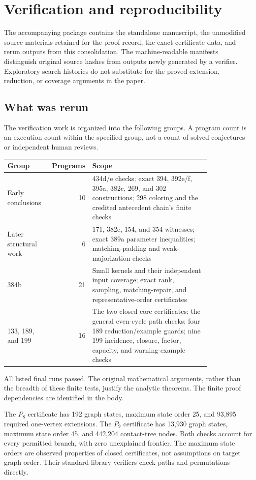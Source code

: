 \documentclass[11pt,a4paper]{article}
\theoremstyle{definition}\newtheorem{definition}[theorem]{Definition}
\theoremstyle{remark}\newtheorem{remark}[theorem]{Remark}
\begin{document}
\section{Verification and reproducibility}
\label{app:verification}
The accompanying package contains the standalone manuscript, the
unmodified source materials retained for the proof record, the exact
certificate data, and rerun outputs from this consolidation. The
machine-readable manifests distinguish original source hashes from
outputs newly generated by a verifier. Exploratory search histories
do not substitute for the proved extension, reduction, or coverage
arguments in the paper.

\subsection{What was rerun}
The verification work is organized into the following groups. A
program count is an execution count within the specified group, not
a count of solved conjectures or independent human reviews.
\begin{center}
\begin{tabular}{p{0.22\linewidth}rp{0.60\linewidth}}
\toprule
Group&Programs&Scope\\\midrule
Early conclusions&10&434d/e checks; exact 394, 392e/f, 395a, 382c,
269, and 302 constructions; 298 coloring and the credited antecedent
chain's finite checks\\[4pt]
Later structural work&6&171, 382e, 154, and 354 witnesses; exact 389a
parameter inequalities; matching-padding and weak-majorization checks\\[4pt]
384b&21&Small kernels and their independent input coverage; exact rank,
sampling, matching-repair, and representative-order certificates\\[4pt]
133, 189, and 199&16&The two closed core certificates; the general
even-cycle path checks; four 189 reduction/example guards; nine 199
incidence, closure, factor, capacity, and warning-example checks\\\bottomrule
\end{tabular}
\end{center}
All listed final runs passed. The original mathematical arguments,
rather than the breadth of these finite tests, justify the analytic
theorems. The finite proof dependencies are identified in the body.

The $P_8$ certificate has 192 graph states, maximum state order 25,
and 93,895 required one-vertex extensions. The $P_9$ certificate has
13,930 graph states, maximum state order 45, and 442,204 contact-tree
nodes. Both checks account for every permitted branch, with zero
unexplained frontier. The maximum state orders are observed properties
of closed certificates, not assumptions on target graph order. Their
standard-library verifiers check paths and permutations directly.
\end{document}
